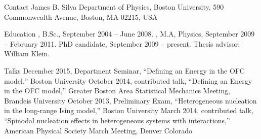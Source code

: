 
\newpage
{}
\begin{category}{Contact}
\citemnobullet James B. Silva
\citemnobullet Department of Physics, Boston University, 590 Commonwealth Avenue, Boston, MA  02215, USA
\end{category}

\begin{category}{Education}
, B.Sc.,  September 2004 -- June 2008.
, M.A, Physics, September 2009 -- February 2011.
 PhD candidate,  September 2009 -- present.
  Thesis advisor: William Klein.
\end{category}

\begin{category}{Talks}
 \citem{} December 2015, Department Seminar, “Defining an Energy in the OFC model,”  Boston University
 \citem{} October 2014, contributed talk, “Defining an Energy in the OFC model,” Greater
Boston Area Statistical Mechanics Meeting, Brandeis University
 \citem{} October 2013, Preliminary Exam, “Heterogeneous nucleation in the long-range Ising model,”  Boston University
 \citem{} March 2014, contributed talk, “Spinodal nucleation effects in heterogeneous systems with \lr interactions,” American Physical Society March Meeting, Denver Colorado
\end{category}



